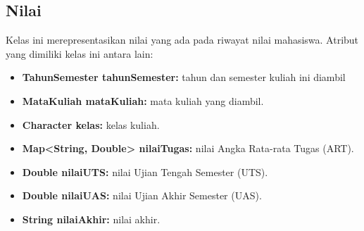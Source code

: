 \subsection{Nilai}
Kelas ini merepresentasikan nilai yang ada pada riwayat nilai mahasiswa. Atribut yang dimiliki kelas ini antara lain:
\begin{itemize}
	\item \textbf{TahunSemester tahunSemester:} tahun dan semester kuliah ini diambil
	\item \textbf{MataKuliah mataKuliah:} mata kuliah yang diambil.
	\item \textbf{Character kelas:} kelas kuliah.
	\item \textbf{Map<String, Double> nilaiTugas:} nilai Angka Rata-rata Tugas (ART).
	\item \textbf{Double nilaiUTS:} nilai Ujian Tengah Semester (UTS).
	\item \textbf{Double nilaiUAS:} nilai Ujian Akhir Semester (UAS).
	\item \textbf{String nilaiAkhir:} nilai akhir.
\end{itemize}

